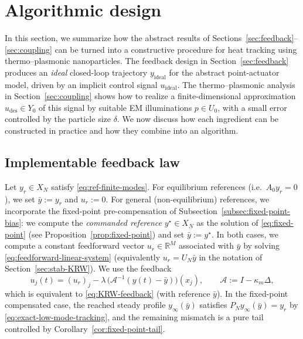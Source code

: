 \documentclass[11pt,a4paper]{article}
\numberwithin{equation}{section}
\theoremstyle{definition}
\newcommand{\R}{\mathbb{R}}
\newcommand{\1}{\mathbbm{1}}
\begin{document}
\section{Algorithmic design}
\label{sec:algorithm}
\noindent
In this section, we summarize how the abstract results of Sections~\ref{sec:feedback}--\ref{sec:coupling} can be turned into a constructive procedure for heat tracking using thermo--plasmonic nanoparticles.
\newline
The feedback design in Section~\ref{sec:feedback} produces an \emph{ideal} closed-loop
trajectory $y_{\mathrm{ideal}}$ for the abstract point-actuator model, driven
by an implicit control signal $u_{\mathrm{ideal}}$. The thermo--plasmonic
analysis in Section~\ref{sec:coupling} shows how to realize a finite-dimensional approximation
$u_{\mathrm{des}}\in Y_0$ of this signal by suitable EM illuminations
$p\in U_0$, with a small error controlled by the particle size $\delta$.
\newline
We now discuss how each ingredient can be constructed in practice and how
they combine into an algorithm.


\subsection{Implementable feedback law}
\label{subsec:alg-KRW}
\noindent
Let $y_r\in X_N$ satisfy \eqref{eq:ref-finite-modes}. For equilibrium references (i.e.\ $A_0y_r=0$), we set
$\bar y:=y_r$ and $u_r:=0$. For general (non-equilibrium) references, we incorporate the fixed-point
pre-compensation of Subsection~\ref{subsec:fixed-point-bias}: we compute the \emph{commanded reference}
$y^\star\in X_N$ as the solution of \eqref{eq:fixed-point} (see Proposition~\ref{prop:fixed-point}) and set
$\bar y:=y^\star$. In both cases, we compute a constant feedforward vector $u_r\in\R^M$ associated with
$\bar y$ by solving \eqref{eq:feedforward-linear-system} (equivalently $u_r=U_N\bar y$ in the notation of Section~\ref{sec:stab-KRW}).
\newline
We use the feedback
\[
u_j(t) = (u_r)_j-\lambda\,\big(\mathcal A^{-1}(y(t)-\bar y)\big)(x_j),
\qquad \mathcal A := I-\kappa_m\Delta,
\]
which is equivalent to \eqref{eq:KRW-feedback} (with reference $\bar y$).
In the fixed-point compensated case, the reached steady profile $y_\infty(\bar y)$ satisfies
$P_Ny_\infty(\bar y)=y_r$ by \eqref{eq:exact-low-mode-tracking}, and the remaining mismatch is a pure tail
controlled by Corollary~\ref{cor:fixed-point-tail}.
\end{document}
